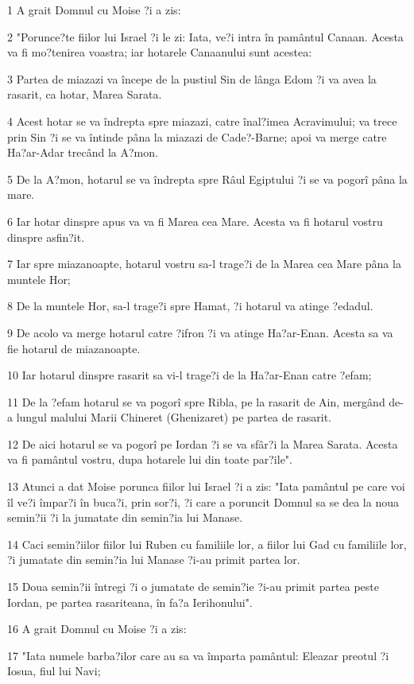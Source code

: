 \par 1 A grait Domnul cu Moise ?i a zis:
\par 2 "Porunce?te fiilor lui Israel ?i le zi: Iata, ve?i intra în pamântul Canaan. Acesta va fi mo?tenirea voastra; iar hotarele Canaanului sunt acestea:
\par 3 Partea de miazazi va începe de la pustiul Sin de lânga Edom ?i va avea la rasarit, ca hotar, Marea Sarata.
\par 4 Acest hotar se va îndrepta spre miazazi, catre înal?imea Acravimului; va trece prin Sin ?i se va întinde pâna la miazazi de Cade?-Barne; apoi va merge catre Ha?ar-Adar trecând la A?mon.
\par 5 De la A?mon, hotarul se va îndrepta spre Râul Egiptului ?i se va pogorî pâna la mare.
\par 6 Iar hotar dinspre apus va va fi Marea cea Mare. Acesta va fi hotarul vostru dinspre asfin?it.
\par 7 Iar spre miazanoapte, hotarul vostru sa-l trage?i de la Marea cea Mare pâna la muntele Hor;
\par 8 De la muntele Hor, sa-l trage?i spre Hamat, ?i hotarul va atinge ?edadul.
\par 9 De acolo va merge hotarul catre ?ifron ?i va atinge Ha?ar-Enan. Acesta sa va fie hotarul de miazanoapte.
\par 10 Iar hotarul dinspre rasarit sa vi-l trage?i de la Ha?ar-Enan catre ?efam;
\par 11 De la ?efam hotarul se va pogorî spre Ribla, pe la rasarit de Ain, mergând de-a lungul malului Marii Chineret (Ghenizaret) pe partea de rasarit.
\par 12 De aici hotarul se va pogorî pe Iordan ?i se va sfâr?i la Marea Sarata. Acesta va fi pamântul vostru, dupa hotarele lui din toate par?ile".
\par 13 Atunci a dat Moise porunca fiilor lui Israel ?i a zis: "Iata pamântul pe care voi îl ve?i împar?i în buca?i, prin sor?i, ?i care a poruncit Domnul sa se dea la noua semin?ii ?i la jumatate din semin?ia lui Manase.
\par 14 Caci semin?iilor fiilor lui Ruben cu familiile lor, a fiilor lui Gad cu familiile lor, ?i jumatate din semin?ia lui Manase ?i-au primit partea lor.
\par 15 Doua semin?ii întregi ?i o jumatate de semin?ie ?i-au primit partea peste Iordan, pe partea rasariteana, în fa?a Ierihonului".
\par 16 A grait Domnul cu Moise ?i a zis:
\par 17 "Iata numele barba?ilor care au sa va împarta pamântul: Eleazar preotul ?i Iosua, fiul lui Navi;
